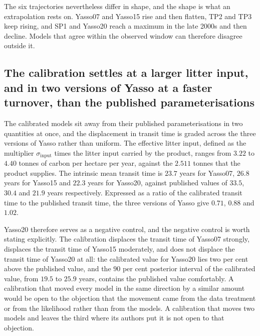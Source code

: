 \documentclass[11pt]{article}
\begin{document}
The six trajectories nevertheless differ in shape, and the shape is what an
extrapolation rests on. Yasso07 and Yasso15 rise and then flatten, TP2 and TP3 keep
rising, and SP1 and Yasso20 reach a maximum in the late 2000s and then decline. Models
that agree within the observed window can therefore disagree outside it.

\subsection{The calibration settles at a larger litter input, and in two versions of
Yasso at a faster turnover, than the published parameterisations}


The calibrated models sit away from their published parameterisations in two
quantities at once, and the displacement in transit time is graded across the three
versions of Yasso rather than uniform. The effective litter input, defined as the
multiplier $\sigma_{\mathrm{input}}$ times the litter input carried by the product,
ranges from $3.22$ to $4.40$ tonnes of carbon per hectare per year, against the
$2.511$ tonnes that the product supplies. The intrinsic mean transit time is $23.7$
years for Yasso07, $26.8$ years for Yasso15 and $22.3$ years for Yasso20, against
published values of $33.5$, $30.4$ and $21.9$ years respectively. Expressed as a
ratio of the calibrated transit time to the published transit time, the three
versions of Yasso give $0.71$, $0.88$ and $1.02$.

Yasso20 therefore serves as a negative control, and the negative control is worth
stating explicitly. The calibration displaces the transit time of Yasso07 strongly,
displaces the transit time of Yasso15 moderately, and does not displace the
transit time of Yasso20 at all: the calibrated value for Yasso20 lies two per cent
above the published value, and the $90$ per cent posterior interval of the calibrated
value, from $19.5$ to $25.9$ years, contains the published value comfortably. A
calibration that moved every model in the same direction by a similar amount would be
open to the objection that the movement came from the data treatment or from the
likelihood rather than from the models. A calibration that moves two models and leaves
the third where its authors put it is not open to that objection.
\end{document}
